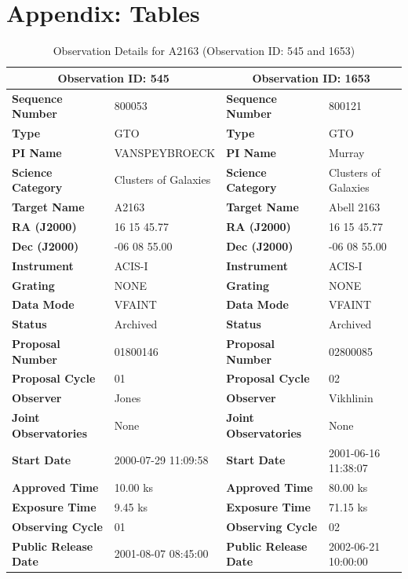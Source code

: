 \documentclass[a4paper,12pt]{article}
\begin{document}
\appendix
\section{Appendix: Tables}

\begin{table}[h]
    \centering
    \caption{Observation Details for A2163 (Observation ID: 545 and 1653)}
    \begin{tabular}{ll|ll}
        \toprule
        \multicolumn{2}{c|}{\textbf{Observation ID: 545}} & \multicolumn{2}{c}{\textbf{Observation ID: 1653}} \\
        \midrule
        \textbf{Sequence Number} & 800053 & \textbf{Sequence Number} & 800121 \\
        \textbf{Type} & GTO & \textbf{Type} & GTO \\
        \textbf{PI Name} & VANSPEYBROECK & \textbf{PI Name} & Murray \\
        \textbf{Science Category} & Clusters of Galaxies & \textbf{Science Category} & Clusters of Galaxies \\
        \textbf{Target Name} & A2163 & \textbf{Target Name} & Abell 2163 \\
        \textbf{RA (J2000)} & 16 15 45.77 & \textbf{RA (J2000)} & 16 15 45.77 \\
        \textbf{Dec (J2000)} & -06 08 55.00 & \textbf{Dec (J2000)} & -06 08 55.00 \\
        \midrule
        \textbf{Instrument} & ACIS-I & \textbf{Instrument} & ACIS-I \\
        \textbf{Grating} & NONE & \textbf{Grating} & NONE \\
        \textbf{Data Mode} & VFAINT & \textbf{Data Mode} & VFAINT \\
        \textbf{Status} & Archived & \textbf{Status} & Archived \\
        \textbf{Proposal Number} & 01800146 & \textbf{Proposal Number} & 02800085 \\
        \textbf{Proposal Cycle} & 01 & \textbf{Proposal Cycle} & 02 \\
        \textbf{Observer} & Jones & \textbf{Observer} & Vikhlinin \\
        \textbf{Joint Observatories} & None & \textbf{Joint Observatories} & None \\
        \midrule
        \textbf{Start Date} & 2000-07-29 11:09:58 & \textbf{Start Date} & 2001-06-16 11:38:07 \\
        \textbf{Approved Time} & 10.00 ks & \textbf{Approved Time} & 80.00 ks \\
        \textbf{Exposure Time} & 9.45 ks & \textbf{Exposure Time} & 71.15 ks \\
        \textbf{Observing Cycle} & 01 & \textbf{Observing Cycle} & 02 \\
        \textbf{Public Release Date} & 2001-08-07 08:45:00 & \textbf{Public Release Date} & 2002-06-21 10:00:00 \\
        \bottomrule
    \end{tabular}
    \label{tab: Data Product details}
\end{table}
\end{document}
